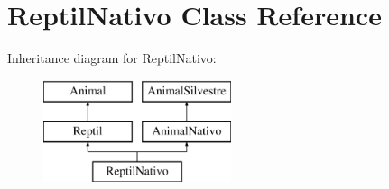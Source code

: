 \hypertarget{class_reptil_nativo}{}\section{Reptil\+Nativo Class Reference}
\label{class_reptil_nativo}
Inheritance diagram for Reptil\+Nativo\+:\begin{figure}[H]
\begin{center}
\leavevmode
\includegraphics[height=3.000000cm]{class_reptil_nativo}
\end{center}
\end{figure}
